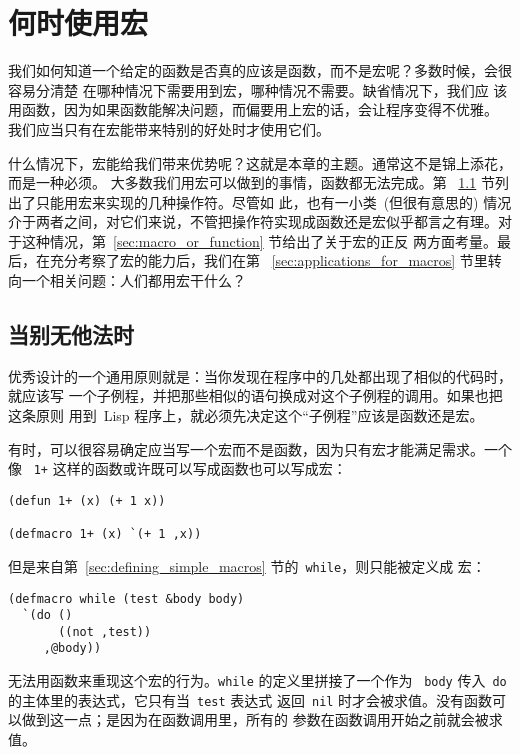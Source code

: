 
\chapter{何时使用宏}
\label{chap:when_to_use_macros}

我们如何知道一个给定的函数是否真的应该是函数，而不是宏呢？多数时候，会很容易分清楚
在哪种情况下需要用到宏，哪种情况不需要。缺省情况下，我们应
该用函数，因为如果函数能解决问题，而偏要用上宏的话，会让程序变得不优雅。
我们应当只有在宏能带来特别的好处时才使用它们。

什么情况下，宏能给我们带来优势呢？这就是本章的主题。通常这不是锦上添花，而是一种必须。
大多数我们用宏可以做到的事情，函数都无法完成。第
~\ref{sec:when_nothing_else_will_do} 节列出了只能用宏来实现的几种操作符。尽管如
此，也有一小类~(但很有意思的) 情况介于两者之间，对它们来说，不管把操作符实现成函数还是宏似乎都言之有理。对于这种情况，第~\ref{sec:macro_or_function} 节给出了关于宏的正反
两方面考量。最后，在充分考察了宏的能力后，我们在第
~\ref{sec:applications_for_macros} 节里转向一个相关问题：人们都用宏干什么？

\section{当别无他法时}
\label{sec:when_nothing_else_will_do}

优秀设计的一个通用原则就是：当你发现在程序中的几处都出现了相似的代码时，就应该写
一个子例程，并把那些相似的语句换成对这个子例程的调用。如果也把这条原则
用到~Lisp 程序上，就必须先决定这个``子例程''应该是函数还是宏。

有时，可以很容易确定应当写一个宏而不是函数，因为只有宏才能满足需求。一个像
~\texttt{1+} 这样的函数或许既可以写成函数也可以写成宏：
\begin{lstlisting}
(defun 1+ (x) (+ 1 x))

(defmacro 1+ (x) `(+ 1 ,x))
\end{lstlisting}
但是来自第~\ref{sec:defining_simple_macros} 节的~\texttt{while}，则只能被定义成
宏：
\begin{lstlisting}
(defmacro while (test &body body)
  `(do ()
       ((not ,test))
     ,@body))
\end{lstlisting}
无法用函数来重现这个宏的行为。\texttt{while} 的定义里拼接了一个作为
~\texttt{body} 传入~\texttt{do} 的主体里的表达式，它只有当~\texttt{test} 表达式
返回~\texttt{nil} 时才会被求值。没有函数可以做到这一点；是因为在函数调用里，所有的
参数在函数调用开始之前就会被求值。

